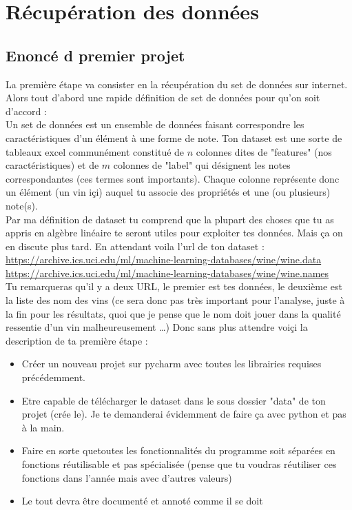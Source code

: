 \documentclass[10pt,a4paper]{book}
\begin{document}
\section{Récupération des données}

\subsection{Enoncé d premier projet}
La première étape va consister en la récupération du set de données sur internet. Alors tout d'abord une rapide définition de set de données pour qu'on soit d'accord :
\\
Un set de données est un ensemble de données faisant correspondre les caractéristiques d'un élément à une forme de note. Ton dataset est une sorte de tableaux excel communément constitué de $n$ colonnes dites de "features" (nos caractéristiques) et de $m$ colonnes de "label" qui désignent les notes correspondantes (ces termes sont importants). Chaque colonne représente donc un élément (un vin içi) auquel tu associe des propriétés et une (ou plusieurs) note(s).
\\
Par ma définition de dataset tu comprend que la plupart des choses que tu as appris en algèbre linéaire te seront utiles pour exploiter tes données. Mais ça on en discute plus tard.
En attendant voila l'url de ton dataset :
\\
\url{https://archive.ics.uci.edu/ml/machine-learning-databases/wine/wine.data}
\url{https://archive.ics.uci.edu/ml/machine-learning-databases/wine/wine.names}
\\
Tu remarqueras qu'il y a deux URL, le premier est tes données, le deuxième est la liste des nom des vins (ce sera donc pas très important pour l'analyse, juste à la fin pour les résultats, quoi que je pense que le nom doit jouer dans la qualité ressentie d'un vin malheureusement \ldots)
Donc sans plus attendre voiçi la description de ta première étape :
\\
 \begin{itemize}

\item Créer un nouveau projet sur pycharm avec toutes les librairies requises précédemment.
\item Etre capable de télécharger le dataset dans le sous dossier "data" de ton projet (crée le). Je te demanderai évidemment de faire ça avec python et pas à la main.
\item Faire en sorte quetoutes les fonctionnalités du programme soit séparées en fonctions réutilisable et pas spécialisée (pense que tu voudras réutiliser ces fonctions dans l'année mais avec d'autres valeurs)
\item Le tout devra être documenté et annoté comme il se doit
\end{itemize}
\end{document}
